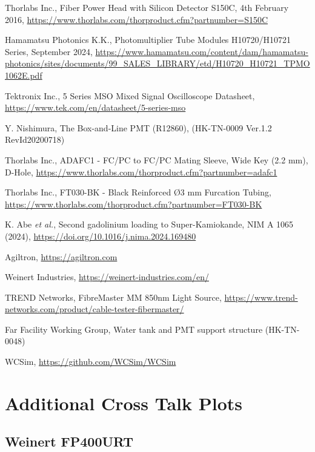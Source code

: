 \documentclass[a4paper,11pt]{article}
\begin{document}
\begin{thebibliography}{99}
Thorlabs Inc., Fiber Power Head with Silicon Detector S150C, 4th February 2016, \url{https://www.thorlabs.com/thorproduct.cfm?partnumber=S150C}

Hamamatsu Photonics K.K., Photomultiplier Tube Modules H10720/H10721 Series, September 2024, \url{https://www.hamamatsu.com/content/dam/hamamatsu-photonics/sites/documents/99_SALES_LIBRARY/etd/H10720_H10721_TPMO1062E.pdf}

Tektronix Inc., 5 Series MSO Mixed Signal Oscilloscope Datasheet, \url{https://www.tek.com/en/datasheet/5-series-mso}

Y. Nishimura, The Box-and-Line PMT (R12860), (HK-TN-0009 Ver.1.2 RevId20200718)

Thorlabs Inc., ADAFC1 - FC/PC to FC/PC Mating Sleeve, Wide Key (2.2 mm), D-Hole, \url{https://www.thorlabs.com/thorproduct.cfm?partnumber=adafc1}

Thorlabs Inc., FT030-BK - Black Reinforced Ø3 mm Furcation Tubing, \url{https://www.thorlabs.com/thorproduct.cfm?partnumber=FT030-BK}

K. Abe {\it et al.}, Second gadolinium loading to Super-Kamiokande, NIM A 1065 (2024), \url{https://doi.org/10.1016/j.nima.2024.169480}


Agiltron, \url{https://agiltron.com}

Weinert Industries, \url{https://weinert-industries.com/en/}

TREND Networks, FibreMaster MM 850nm Light Source, \url{https://www.trend-networks.com/product/cable-tester-fibermaster/}


Far Facility Working Group, Water tank and PMT support structure (HK-TN-0048)


WCSim, \url{https://github.com/WCSim/WCSim}

\end{thebibliography}

\clearpage
\newpage
\appendix

\section{Additional Cross Talk Plots}\label{app:crosstalk}

\subsection{Weinert FP400URT}
\end{document}
